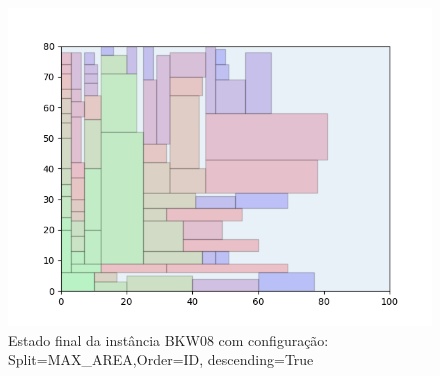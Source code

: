 \begin{figure}[H]
    \centering
    \caption[]{Estado final da instância BKW08 com configuração: Split=MAX_AREA,Order=ID, descending=True}
    \label{fig:bkw08-max_area-id-true}
    \includegraphics[scale=0.5]{output/figures/bkw/bkw08/max_area/id/true/00}
\end{figure}